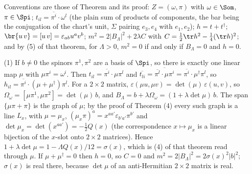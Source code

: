 Conventions are those of Theorem  and its proof: $Z = (\omega, \pi)$ with $\omega \in \Som$, $\pi \in \Spi$; $t_{il} = \overline{\pi^{i}}\cdot\omega^{l}$ (the plain sum of products of components, the bar being the conjugation of the chart's unit, $\Sigma$ pairing $e_{3}, e_{4}$ with $e_{1}, e_{2}$); $h = t + t^{\dagger}$; $\br{u\,v} = [u\,v] = \varepsilon_{ab}u^{a}v^{b}$; $m^{2} = 2|B_{\Lambda}|^{2} + 2\lambda C$ with $C = \tfrac12\tr h^{2} - \tfrac14(\tr h)^{2}$; and by (5) of that theorem, for $\Lambda > 0$, $m^{2} = 0$ if and only if $B_{\Lambda} = 0$ and $h = 0$.

(1) If $b \neq 0$ the spinors $\pi^{1}, \pi^{2}$ are a basis of $\Spi$, so there is exactly one linear map $\mu$ with $\mu\pi^{i} = \omega^{i}$. Then $t_{il} = \overline{\pi^{i}}\cdot\mu\pi^{l}$ and $\overline{t_{li}} = \overline{\overline{\pi^{l}}\cdot\mu\pi^{i}} = \overline{\pi^{i}}\cdot\mu^{\dagger}\pi^{l}$, so $h_{il} = \overline{\pi^{i}}\cdot(\mu + \mu^{\dagger})\pi^{l}$. For a $2\times 2$ matrix, $\varepsilon(\mu u, \mu v) = \det(\mu)\,\varepsilon(u, v)$, so $\Omega_{\omega} = [\mu\pi^{1}, \mu\pi^{2}] = \det(\mu)\,b$, and $B_{\Lambda} = b + \lambda\Omega_{\omega} = (1 + \lambda\det\mu)\,b$. The span $\{\mu\pi + \pi\}$ is the graph of $\mu$; by the proof of Theorem (4) every such graph is a line $L_{x}$, with $\mu = \mu_{x}$, $(\mu_{x}\pi)^{a} = x^{aa'}\varepsilon_{b'a'}\pi^{b'}$ and $\det\mu_{x} = \det(x^{aa'}) = -\tfrac12 Q(x)$ (the correspondence $x \mapsto \mu_{x}$ is a linear bijection of the $x$-slot onto $2\times 2$ matrices). Hence $1 + \lambda\det\mu = 1 - \Lambda Q(x)/12 = \sigma(x)$, which is (4) of that theorem read through $\mu$. If $\mu + \mu^{\dagger} = 0$ then $h = 0$, so $C = 0$ and $m^{2} = 2|B_{\Lambda}|^{2} = 2\sigma(x)^{2}|b|^{2}$; $\sigma(x)$ is real there, because $\det\mu$ of an anti-Hermitian $2\times 2$ matrix is real.

